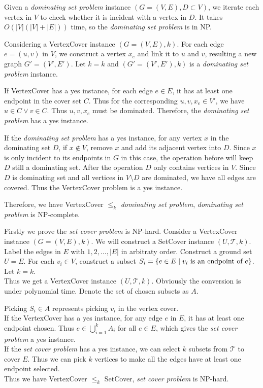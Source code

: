 \documentclass{oxmathproblems}
\begin{document}
\begin{questions}
\setcounter{question}{2}

\miquestion
Given a \emph{dominating set problem} instance $(G=(V,E),D\subset V)$, we iterate each vertex in $V$ to check whether it is incident with a vertex in $D$. It takes $O(|V|(|V|+|E|))$ time, so the \emph{dominating set problem} is in NP.

Considering a VertexCover instance $(G=(V,E),k)$. For each edge $e=(u,v)$ in $V$, we construct a vertex $x_e$ and link it to $u$ and $v$, resulting a new graph $G'=(V',E')$. Let $k=k$ and $(G'=(V',E'),k)$ is a \emph{dominating set problem} instance.

If VertexCover has a yes instance, for each edge $e\in E$, it has at least one endpoint in the cover set $C$. Thus for the corresponding $u,v,x_e\in V'$, we have $u\in C\lor v\in C$. Thus $u,v,x_e$ must be dominated. Therefore, the \emph{dominating set problem} has a yes instance.

If the \emph{dominating set problem} has a yes instance, for any vertex $x$ in the dominating set $D$, if $x\notin V$, remove $x$ and add its adjacent vertex into $D$. 
Since $x$ is only incident to its endpoints in $G$ in this case, the operation before will keep $D$ still a dominating set. After the operation $D$ only contains vertices in $V$. 
Since $D$ is dominating set and all vertices in $V\setminus D$ are dominated, we have all edges are covered. Thus the VertexCover problem is a yes instance.

Therefore, we have VertexCover $\le_k$ \emph{dominating set problem}, \emph{dominating set problem} is NP-complete.

\miquestion
Firstly we prove the \emph{set cover problem} is NP-hard. Consider a VertexCover instance $(G=(V,E),k)$. We will construct a SetCover instance $(U,\mathcal{T},k)$. 
Label the edges in $E$ with $1,2,\dots,|E|$ in arbitraty order. Construct a ground set $U=E$. For each $v_i\in V$, construct a subset $S_i=\{e\in E\mid v_i \hbox{ is an endpoint of } e\}$. Let $k=k$.\\
Thus we get a VertexCover instance $(U,\mathcal{T},k)$. Obviously the conversion is under polynomial time. Denote the set of chosen subsets as $A$.

Picking $S_i\in A$ represents picking $v_i$ in the vertex cover.\\
If the VertexCover has a yes instance, for any edge $e$ in $E$, it has at least one endpoint chosen. Thus $e\in\bigcup_{i=1}^k A_i$ for all $e\in E$, which gives the \emph{set cover problem} a yes instance.\\
If the \emph{set cover problem} has a yes instance, we can select $k$ subsets from $\mathcal{T}$ to cover $E$. Thus we can pick $k$ vertices to make all the edges have at least one endpoint selected.\\
Thus we have VertexCover $\le_k$ SetCover, \emph{set cover problem} is NP-hard.


\end{questions}
\end{document}

